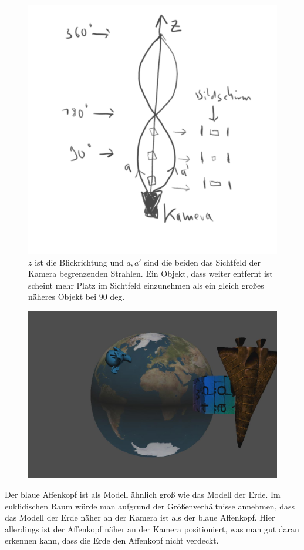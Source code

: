 \documentclass[11pt]{article}
\begin{document}
    \begin{figure}[H]
        \includegraphics[width=0.8\linewidth]{cameraPerspective.png}
        \caption{
            $z$ ist die Blickrichtung und $a,a'$ sind die beiden das Sichtfeld der Kamera begrenzenden Strahlen.
            Ein Objekt, dass weiter entfernt ist scheint mehr Platz im Sichtfeld einzunehmen als ein gleich großes
            näheres Objekt bei 90 deg.
        }
        \label{fig:cameraPerspective}
    \end{figure}


    \begin{figure}[H]
        \includegraphics[width=0.8\linewidth]{screenshot.png}
        \caption{
        }
        \label{fig:screenshot}
    \end{figure}

    Der blaue Affenkopf ist als Modell ähnlich groß wie das Modell der Erde.
    Im euklidischen Raum würde man aufgrund der Größenverhältnisse annehmen, dass das Modell der Erde näher
    an der Kamera ist als der blaue Affenkopf. Hier allerdings ist der Affenkopf näher an der Kamera positioniert, was
    man gut daran erkennen kann, dass die Erde den Affenkopf nicht verdeckt.
\end{document}
